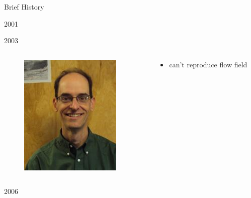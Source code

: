 \documentclass[hide notes,intlimits]{beamer}
\begin{document}
\begin{frame}{Brief History}
  \begin{block}{2001}  
  \end{block}

  \begin{block}{2003}  
    \begin{columns}[c]
      \begin{column}{.12\linewidth}
        \begin{figure}
          \includegraphics[width=\textwidth]{ed_bueler}
        \end{figure}
      \end{column}
      \begin{column}{.35\linewidth}
        \begin{itemize}
        \item can't reproduce flow field
        \end{itemize}
      \end{column}
    \end{columns}
  \end{block}

  \begin{block}{2006}  
  \end{block}

\end{frame}
\end{document}
